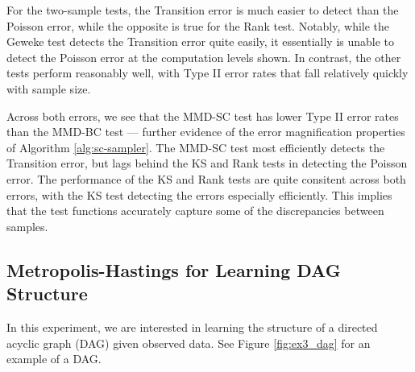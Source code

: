 \documentclass[a4paper,11pt]{article}
\begin{document}
For the two-sample tests, the Transition error is much easier to detect than the Poisson error, while the opposite is true for the Rank test.  Notably, while the Geweke test detects the Transition error quite easily, it essentially is unable to detect the Poisson error at the computation levels shown. In contrast, the other tests perform reasonably well, with Type II error rates that fall relatively quickly with sample size. 

Across both errors, we see that the MMD-SC test has lower Type II error rates than the MMD-BC test --- further evidence of the error magnification properties of Algorithm \ref{alg:sc-sampler}. The MMD-SC test most efficiently detects the Transition error, but lags behind the KS and Rank tests in detecting the Poisson error. The performance of the KS and Rank tests are quite consitent across both errors, with the KS test detecting the errors especially efficiently. This implies that the test functions accurately capture some of the discrepancies between samples.



\subsection{Metropolis-Hastings for Learning DAG Structure}
In this experiment, we are interested in learning the structure of a directed acyclic graph (DAG) given observed data. See Figure \ref{fig:ex3_dag} for an example of a DAG.
\end{document}
